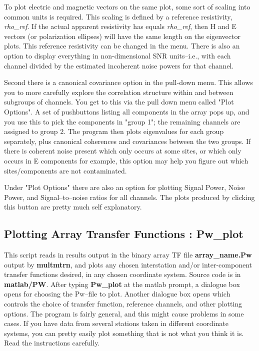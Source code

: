 To plot electric and magnetic vectors on the same plot, some sort of
scaling into common units is required.  This scaling is defined by a
reference resistivity, {\it rho\_ref}. 
If the actual apparent resistivity has equals {\it rho\_ref}, then H and E vectors
(or polarization ellipses) will have the same length on the eigenvector plots. 
This reference resistivity can be changed in the menu.  There is also an option
to display everything in non-dimensional SNR units--i.e., with each channel
divided by the estimated incoherent noise powers for that channel.

Second there is a canonical covariance option in the pull-down
menu.  This allows you to more carefully explore the correlation
structure within and between subgroups of channels.
You get to this via the pull down menu called
"Plot Options".  A set of pushbuttons listing all components in 
the array pops up, and you use this to pick the components in "group 1";
the remaining channels are assigned to group 2.  The program then 
plots eigenvalues for each group separately, plus canonical
coherences and covariances between the two groups.
If there is coherent noise present which only occurs at some sites,
or which only occurs in E components for example, this option may
help you figure out which sites/components are not contaminated.

Under "Plot Options" there are also an option for plotting
Signal Power, Noise Power, and
Signal--to--noise ratios for all channels.
The plots produced by clicking
this button are pretty much self explanatory.

\subsection{Plotting Array Transfer Functions : Pw\_plot}

This script reads in results output in the binary array TF
file {\bf array\_name.Pw} output by {\bf multmtrn}, and plots
any chosen interstation and/or
inter-component transfer functions desired, in any chosen coordinate system.
Source code is in {\bf matlab/PW}.  After typing {\bf Pw\_plot}
at the matlab prompt, a dialogue box opens for choosing the Pw--file to
plot.  Another dialogue box opens which controls the choice of transfer
function, reference channels, and other plotting options.
The program is fairly general, and this might cause
problems in some cases.  If you have data from several stations
taken in different coordinate systems,
you can pretty easily plot something that is not
what you think it is.  Read the instructions carefully.

